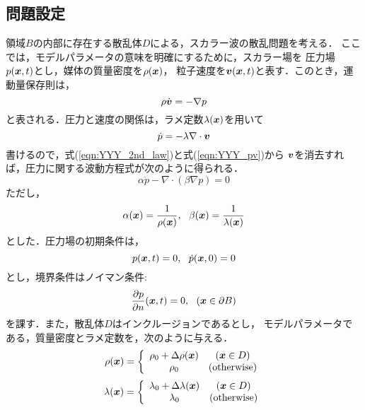 \subsection{問題設定}
領域$B$の内部に存在する散乱体$D$による，スカラー波の散乱問題を考える．
ここでは，モデルパラメータの意味を明確にするために，スカラー場を
圧力場$p(\mbox{\boldmath $x$},t)$とし，媒体の質量密度を$\rho(\mbox{\boldmath $x$})$，
粒子速度を$\mbox{\boldmath $v$}(\mbox{\boldmath $x$},t)$と表す．このとき，運動量保存則は，
\begin{equation}
	\rho \dot{\mbox{\boldmath $v$}}= -\nabla p
	\label{eqn:YYY_2nd_law}
\end{equation}
と表される．圧力と速度の関係は，ラメ定数$\lambda(\mbox{\boldmath $x$})$を用いて
\begin{equation}
	\dot{p}=-\lambda \nabla \cdot \mbox{\boldmath $v$}
	\label{eqn:YYY_pv}
\end{equation}
書けるので，式(\ref{eqn:YYY_2nd_law})と式(\ref{eqn:YYY_pv})から
$\mbox{\boldmath $v$}$を消去すれば，圧力に関する波動方程式が次のように得られる．
\begin{equation}
	\alpha \ddot{p}-\nabla \cdot \left(\beta  \nabla  p \right)=0
	\label{eqn:YYY_wveq_p}
\end{equation}
ただし，
\begin{equation}
	\alpha(\mbox{\boldmath $x$}) = \frac{1}{\rho(\mbox{\boldmath $x$})}, \ \ \beta(\mbox{\boldmath $x$})=\frac{1}{\lambda(\mbox{\boldmath $x$})}
	\label{eqn:YYY_consts_ab}
\end{equation}
とした．圧力場の初期条件は，
\begin{equation}
	p(\mbox{\boldmath $x$},t)=0, \ \ \dot{p}(\mbox{\boldmath $x$},0)=0
	\label{eqn:YYY_IC_p}
\end{equation}
とし，境界条件はノイマン条件:
\begin{equation}
	\frac{\partial p}{\partial n}(\mbox{\boldmath $x$},t)=0, \ \ \left( \mbox{\boldmath $x$} \in  \partial B \right)
	\label{eqn:YYY_BC_p}
\end{equation}
を課す．また，散乱体$D$はインクルージョンであるとし，
モデルパラメータである，質量密度とラメ定数を，次のように与える．
\begin{equation}
	\rho (\mbox{\boldmath $x$})=
	\left\{
	\begin{array}{cc}
		\rho_0 +\Delta \rho(\mbox{\boldmath $x$}) & (\mbox{\boldmath $x$}\in D) \\
		\rho_0 & (\rm otherwise)
	\end{array}
	\right.
	\label{eqn:YYY_rho_x}
\end{equation}
\begin{equation}
	\lambda (\mbox{\boldmath $x$})=
	\left\{
	\begin{array}{cc}
		\lambda_0 +\Delta \lambda(\mbox{\boldmath $x$}) & (\mbox{\boldmath $x$}\in D) \\
		\lambda_0 & (\rm otherwise)
	\end{array}
	\right.
	\label{eqn:YYY_rho_x}
\end{equation}
